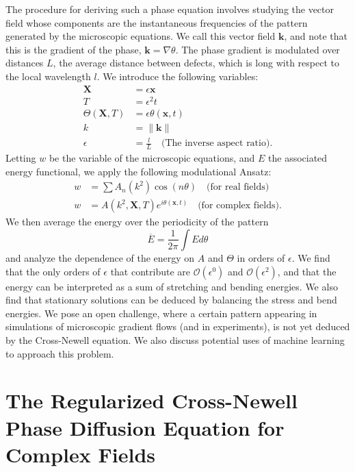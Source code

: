 \documentclass[12pt]{article}
\numberwithin{equation}{section}
\begin{document}
\par The procedure for deriving such a phase equation involves studying the vector field whose components are the instantaneous frequencies of the pattern generated by the microscopic equations. We call this vector field $\bm{k}$, and note that this is the gradient of the phase, $\bm{k} = \nabla \theta$. The phase gradient is modulated over distances $L$, the average distance between defects, which is long with respect to the local wavelength $l$. We introduce the following variables:
\begin{align*}
    \bm{X} &= \epsilon\bm{x}\\
    T &= \epsilon^2 t\\
    \Theta(\bm{X},T) &= \epsilon \theta(\bm{x},t)\\
    k &= \|\bm{k}\|\\
    \epsilon &= \frac{l}{L} \quad \text{(The inverse aspect ratio)}.
\end{align*}
Letting $w$ be the variable of the microscopic equations, and $E$ the associated energy functional, we apply the following modulational Ansatz:
\begin{align}
    w &= \sum A_n(k^2)\cos(n\theta) \quad \text{(for real fields)}\\
    w &= A(k^2,\bm{X},T)e^{i\theta(\bm{x},t)} \quad \text{(for complex fields)}.
\end{align}
We then average the energy over the periodicity of the pattern
\begin{equation}
    \overline{E} = \frac{1}{2\pi} \int E d\theta
\end{equation}
and analyze the dependence of the energy on $A$ and $\Theta$ in orders of $\epsilon$. We find that the only orders of $\epsilon$ that contribute are $\mathcal{O}(\epsilon^0)$ and $\mathcal{O}(\epsilon^2)$, and that the energy can be interpreted as a sum of stretching and bending energies. We also find that stationary solutions can be deduced by balancing the stress and bend energies. We pose an open challenge, where a certain pattern appearing in simulations of microscopic gradient flows (and in experiments), is not yet deduced by the Cross-Newell equation. We also discuss potential uses of machine learning to approach this problem. 
\section{The Regularized Cross-Newell Phase Diffusion Equation for Complex Fields}
\end{document}
